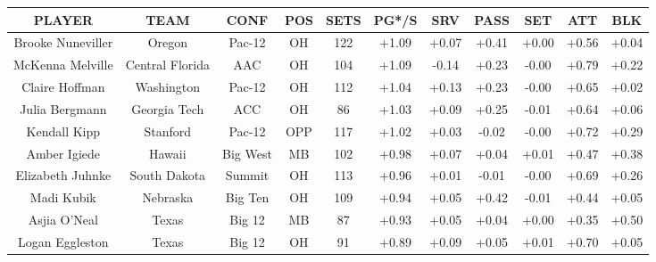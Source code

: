 \begin{tabular}{ccccc|c|ccccc}
     PLAYER & TEAM&  CONF &  POS &  SETS &  PG*/S&  SRV &  PASS &  SET &ATT &BLK\\
     \hline
     Brooke Nuneviller&  Oregon&  Pac-12&  OH&  122&  +1.09&  +0.07&  +0.41&  +0.00&  +0.56&+0.04\\
     McKenna Melville&  Central Florida&  AAC&  OH&  104&  +1.09&  -0.14&  +0.23&  -0.00&  +0.79&+0.22\\
     Claire Hoffman&  Washington&  Pac-12&  OH&  112&  +1.04&  +0.13&  +0.23&  -0.00&  +0.65&+0.02\\
     Julia Bergmann&  Georgia Tech&  ACC&  OH&  86&  +1.03&  +0.09&  +0.25&  -0.01&  +0.64&+0.06\\
     Kendall Kipp&  Stanford&  Pac-12&  OPP&  117&  +1.02&  +0.03&  -0.02&  -0.00&  +0.72&+0.29\\
     Amber Igiede&  Hawaii&  Big West&  MB&  102&  +0.98&  +0.07&  +0.04&  +0.01&  +0.47&+0.38\\
     Elizabeth Juhnke&  South Dakota&  Summit&  OH&  113&  +0.96&  +0.01&  -0.01&  -0.00&  +0.69&+0.26\\
     Madi Kubik&  Nebraska&  Big Ten&  OH&  109&  +0.94&  +0.05&  +0.42&  -0.01&  +0.44&+0.05\\
     Asjia O'Neal&  Texas&  Big 12&  MB&  87&  +0.93&  +0.05&  +0.04&  +0.00&  +0.35&+0.50\\
Logan Eggleston& Texas& Big 12& OH& 91& +0.89& +0.09& +0.05& +0.01& +0.70&+0.05\\
\end{tabular}
